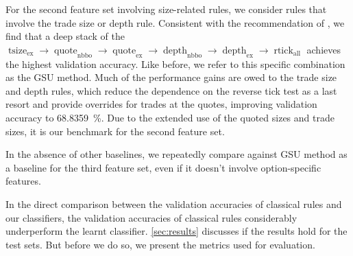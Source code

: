 For the second feature set involving size-related rules, we consider rules that involve the trade size or depth rule. Consistent with the recommendation of \textcite[][14]{grauerOptionTradeClassification2022}, we find that a deep stack of the $\operatorname{tsize}_{\mathrm{ex}} \to \operatorname{quote}_{\mathrm{nbbo}} \to \operatorname{quote}_{\mathrm{ex}} \to \operatorname{depth}_{\mathrm{nbbo}} \to \operatorname{depth}_{\mathrm{ex}} \to \operatorname{rtick}_{\mathrm{all}}$ achieves the highest validation accuracy. Like before, we refer to this specific combination as the \gls{GSU} method. Much of the performance gains are owed to the trade size and depth rules, which reduce the dependence on the reverse tick test as a last resort and provide overrides for trades at the quotes, improving validation accuracy to \SI{68.8359}{\percent}. Due to the extended use of the quoted sizes and trade sizes, it is our benchmark for the second feature set.

In the absence of other baselines, we repeatedly compare against \gls{GSU} method as a baseline for the third feature set, even if it doesn't involve option-specific features.

In the direct comparison between the validation accuracies of classical rules and our classifiers, the validation accuracies of classical rules considerably underperform the learnt classifier. \cref{sec:results} discusses if the results hold for the test sets. But before we do so, we present the metrics used
for evaluation.
